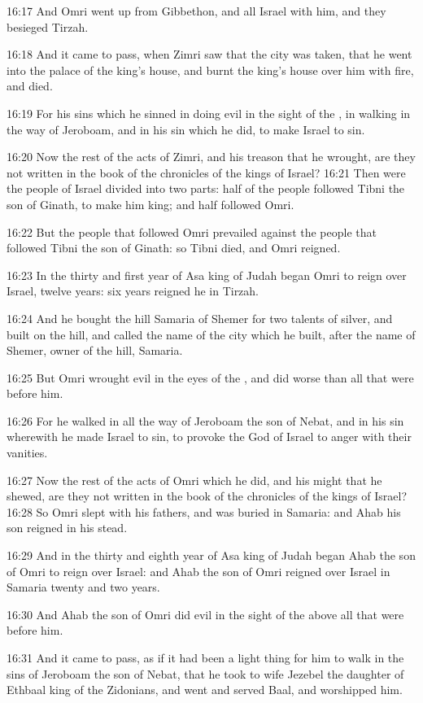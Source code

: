 16:17 And Omri went up from Gibbethon, and all Israel with him, and they besieged Tirzah.

16:18 And it came to pass, when Zimri saw that the city was taken, that he went into the palace of the king's house, and burnt the king's house over him with fire, and died.

16:19 For his sins which he sinned in doing evil in the sight of the \LORD, in walking in the way of Jeroboam, and in his sin which he did, to make Israel to sin.

16:20 Now the rest of the acts of Zimri, and his treason that he wrought, are they not written in the book of the chronicles of the kings of Israel?  16:21 Then were the people of Israel divided into two parts: half of the people followed Tibni the son of Ginath, to make him king; and half followed Omri.

16:22 But the people that followed Omri prevailed against the people that followed Tibni the son of Ginath: so Tibni died, and Omri reigned.

16:23 In the thirty and first year of Asa king of Judah began Omri to reign over Israel, twelve years: six years reigned he in Tirzah.

16:24 And he bought the hill Samaria of Shemer for two talents of silver, and built on the hill, and called the name of the city which he built, after the name of Shemer, owner of the hill, Samaria.

16:25 But Omri wrought evil in the eyes of the \LORD, and did worse than all that were before him.

16:26 For he walked in all the way of Jeroboam the son of Nebat, and in his sin wherewith he made Israel to sin, to provoke the \LORD God of Israel to anger with their vanities.

16:27 Now the rest of the acts of Omri which he did, and his might that he shewed, are they not written in the book of the chronicles of the kings of Israel?  16:28 So Omri slept with his fathers, and was buried in Samaria: and Ahab his son reigned in his stead.

16:29 And in the thirty and eighth year of Asa king of Judah began Ahab the son of Omri to reign over Israel: and Ahab the son of Omri reigned over Israel in Samaria twenty and two years.

16:30 And Ahab the son of Omri did evil in the sight of the \LORD above all that were before him.

16:31 And it came to pass, as if it had been a light thing for him to walk in the sins of Jeroboam the son of Nebat, that he took to wife Jezebel the daughter of Ethbaal king of the Zidonians, and went and served Baal, and worshipped him.

